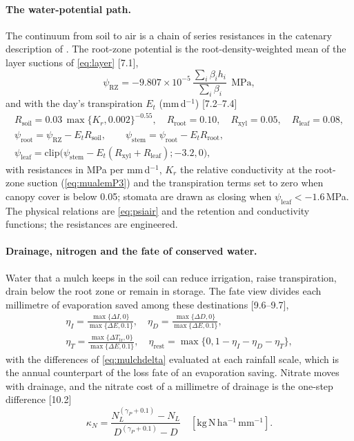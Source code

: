 \documentclass[preprint,12pt]{elsarticle}
\begin{document}
\paragraph{The water-potential path.} The continuum from soil to air is a chain of series resistances in the catenary description of \cite{vandenHonert1948}. The root-zone potential is the root-density-weighted mean of the layer suctions of \cref{eq:layer} [7.1],
\begin{equation}
\psi_{\mathrm{RZ}}=-9.807\times10^{-5}\,\frac{\sum_i\beta_ih_i}{\sum_i\beta_i}\ \ \mathrm{MPa},
\label{eq:psisoil}
\end{equation}
and with the day's transpiration $E_t$ (mm\,d$^{-1}$) [7.2--7.4]
\begin{equation}
\begin{gathered}
R_{\mathrm{soil}}=0.03\,\max\{K_r,0.002\}^{-0.55},\quad R_{\mathrm{root}}=0.10,\quad R_{\mathrm{xyl}}=0.05,\quad R_{\mathrm{leaf}}=0.08,\\
\psi_{\mathrm{root}}=\psi_{\mathrm{RZ}}-E_tR_{\mathrm{soil}},\qquad \psi_{\mathrm{stem}}=\psi_{\mathrm{root}}-E_tR_{\mathrm{root}},\\ \psi_{\mathrm{leaf}}=\mathrm{clip}\bigl(\psi_{\mathrm{stem}}-E_t(R_{\mathrm{xyl}}+R_{\mathrm{leaf}});-3.2,0\bigr),
\end{gathered}
\label{eq:spac}
\end{equation}
with resistances in MPa per mm\,d$^{-1}$, $K_r$ the relative conductivity at the root-zone suction (\cref{eq:mualemP3}) and the transpiration terms set to zero when canopy cover is below 0.05; stomata are drawn as closing when $\psi_{\mathrm{leaf}}<-1.6$\,MPa. The physical relations are \cref{eq:psiair} and the retention and conductivity functions; the resistances are engineered.

\paragraph{Drainage, nitrogen and the fate of conserved water.}
\label{sec:sys-fate}
Water that a mulch keeps in the soil can reduce irrigation, raise transpiration, drain below the root zone or remain in storage. The fate view divides each millimetre of evaporation saved among these destinations [9.6--9.7],
\begin{equation}
\begin{gathered}\eta_I=\frac{\max\{\Delta I,0\}}{\max\{\Delta E,0.1\}},\quad \eta_D=\frac{\max\{\Delta D,0\}}{\max\{\Delta E,0.1\}},\\ \eta_T=\frac{\max\{\Delta T_{\mathrm{tr}},0\}}{\max\{\Delta E,0.1\}},\quad \eta_{\mathrm{rest}}=\max\{0,1-\eta_I-\eta_D-\eta_T\},\end{gathered}
\label{eq:fate}
\end{equation}
with the differences of \cref{eq:mulchdelta} evaluated at each rainfall scale, which is the annual counterpart of the loss fate of an evaporation saving. Nitrate moves with drainage, and the nitrate cost of a millimetre of drainage is the one-step difference [10.2]
\begin{equation}
\kappa_N=\frac{N_L^{(\gamma_P+0.1)}-N_L}{D^{(\gamma_P+0.1)}-D}\quad[\mathrm{kg\,N\,ha^{-1}\,mm^{-1}}].
\label{eq:kappaN}
\end{equation}
\end{document}
